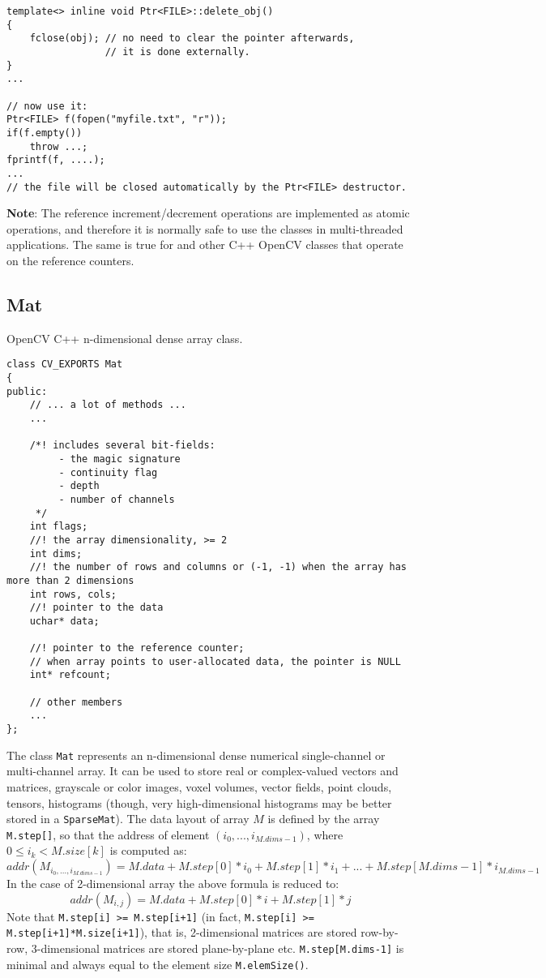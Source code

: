 \begin{lstlisting}
template<> inline void Ptr<FILE>::delete_obj()
{
    fclose(obj); // no need to clear the pointer afterwards,
                 // it is done externally.
}
...

// now use it:
Ptr<FILE> f(fopen("myfile.txt", "r"));
if(f.empty())
    throw ...;
fprintf(f, ....);
...
// the file will be closed automatically by the Ptr<FILE> destructor.
\end{lstlisting}  

\textbf{Note}: The reference increment/decrement operations are implemented as atomic operations, and therefore it is normally safe to use the classes in multi-threaded applications. The same is true for  and other C++ OpenCV classes that operate on the reference counters.

\subsection{Mat}\label{Mat}
OpenCV C++ n-dimensional dense array class.

\begin{lstlisting}
class CV_EXPORTS Mat
{
public:
    // ... a lot of methods ...
    ...
    
    /*! includes several bit-fields:
         - the magic signature
         - continuity flag
         - depth
         - number of channels
     */
    int flags;
    //! the array dimensionality, >= 2
    int dims;
    //! the number of rows and columns or (-1, -1) when the array has more than 2 dimensions
    int rows, cols;
    //! pointer to the data
    uchar* data;

    //! pointer to the reference counter;
    // when array points to user-allocated data, the pointer is NULL
    int* refcount;
    
    // other members
    ...
};
\end{lstlisting}

The class \texttt{Mat} represents an n-dimensional dense numerical single-channel or multi-channel array. It can be used to store real or complex-valued vectors and matrices, grayscale or color images, voxel volumes, vector fields, point clouds, tensors, histograms (though, very high-dimensional histograms may be better stored in a \texttt{SparseMat}). The data layout of array $M$ is defined by the array \texttt{M.step[]}, so that the address of element $(i_0,...,i_{M.dims-1})$, where $0\leq i_k<M.size[k]$ is computed as:
\[
addr(M_{i_0,...,i_{M.dims-1}}) = M.data + M.step[0]*i_0 + M.step[1]*i_1 + ... + M.step[M.dims-1]*i_{M.dims-1}
\]
In the case of 2-dimensional array the above formula is reduced to:
\[
addr(M_{i,j}) = M.data + M.step[0]*i + M.step[1]*j
\]
Note that \texttt{M.step[i] >= M.step[i+1]} (in fact, \texttt{M.step[i] >= M.step[i+1]*M.size[i+1]}), that is, 2-dimensional matrices are stored row-by-row, 3-dimensional matrices are stored plane-by-plane etc. \texttt{M.step[M.dims-1]} is minimal and always equal to the element size \texttt{M.elemSize()}.

